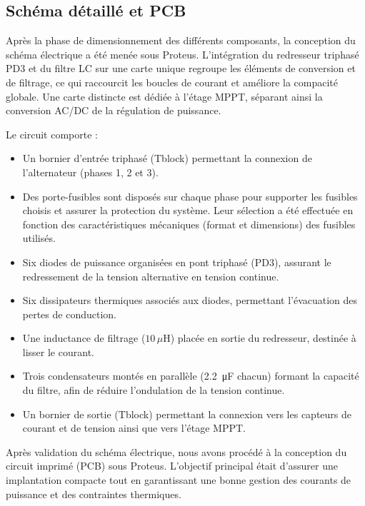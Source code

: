         \subsection{Schéma détaillé et PCB}
        Après la phase de dimensionnement des différents composants, la conception du schéma électrique a été menée sous Proteus. L'intégration du redresseur triphasé PD3 et du filtre LC sur une carte unique regroupe les éléments de conversion et de filtrage, ce qui raccourcit les boucles de courant et améliore la compacité globale. Une carte distincte est dédiée à l'étage MPPT, séparant ainsi la conversion AC/DC de la régulation de puissance.

        Le circuit comporte :
        \begin{itemize}
            \item Un bornier d'entrée triphasé (Tblock) permettant la connexion de l'alternateur (phases 1, 2 et 3).
            \item Des porte-fusibles sont disposés sur chaque phase pour supporter les fusibles choisis et assurer la protection du système. Leur sélection a été effectuée en fonction des caractéristiques mécaniques (format et dimensions) des fusibles utilisés.
            \item Six diodes de puissance organisées en pont triphasé (PD3), assurant le redressement de la tension alternative en tension continue.
            \item Six dissipateurs thermiques associés aux diodes, permettant l'évacuation des pertes de conduction.
            \item Une inductance de filtrage ($10 \, \mu\text{H}$) placée en sortie du redresseur, destinée à lisser le courant.
            \item Trois condensateurs montés en parallèle (\SI{2.2}{\micro\farad} chacun) formant la capacité du filtre, afin de réduire l'ondulation de la tension continue.
            \item Un bornier de sortie (Tblock) permettant la connexion vers les capteurs de courant et de tension ainsi que vers l'étage MPPT.
        \end{itemize}

        Après validation du schéma électrique, nous avons procédé à la conception du circuit imprimé (PCB) sous Proteus. L'objectif principal était d'assurer une implantation compacte tout en garantissant une bonne gestion des courants de puissance et des contraintes thermiques.


